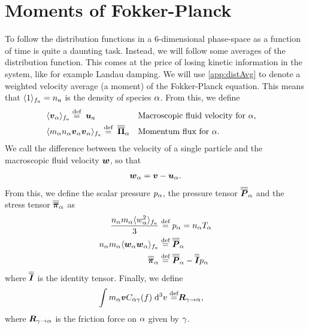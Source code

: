 \section{Moments of Fokker-Planck}
To follow the distribution functions in a 6-dimensional phase-space as a function of time is quite a daunting task.
Instead, we will follow some averages of the distribution function.
This comes at the price of losing kinetic information in the system, like for example Landau damping.
We will use \cref{app:distAvg} to denote a weighted velocity average (a moment) of the Fokker-Planck equation.
This means that $\langle{1}\rangle_{f_a}=n_a$ is the density of species $\alpha$.
From this, we define
%
\begin{align*}
    &\langle{\boldsymbol{v}_\alpha}\rangle_{f_a} \overset{\text{def}}{=} \; \boldsymbol{u}_a&  &\text{Macroscopic fluid velocity for }\alpha,&\\
    &\langle{m_\alpha n_\alpha\boldsymbol{v}_\alpha\boldsymbol{v}_\alpha}\rangle_{f_a} \overset{\text{def}}{=}\; \boldsymbol{\overline{\overline{\Pi}}}_\alpha&  &\text{Momentum flux for }\alpha.&
\end{align*}
%
We call the difference between the velocity of a single particle and the macroscopic fluid velocity $\boldsymbol{w}$, so that
%
\begin{align*}
    \boldsymbol{w}_\alpha = \boldsymbol{v} - \boldsymbol{u}_\alpha.
\end{align*}
%
From this, we define the scalar pressure $p_\alpha$, the pressure tensor $\boldsymbol{\overline{\overline{P}}}_\alpha$ and the stress tensor $\boldsymbol{\overline{\overline{\pi}}}_\alpha$ as
%
\begin{align*}
    \frac{n_\alpha m_\alpha\langle{w_\alpha^2}\rangle_{f_a}}{3} \overset{\text{def}}{=}& \; p_\alpha = n_\alpha T_\alpha\\
    n_\alpha m_\alpha\langle{\boldsymbol{w}_{\alpha}\boldsymbol{w}_{\alpha}}\rangle_{f_a} \overset{\text{def}}{=}& \; \boldsymbol{\overline{\overline{P}}}_\alpha\\
    \boldsymbol{\overline{\overline{\pi}}}_\alpha \overset{\text{def}}{=}& \; \boldsymbol{\overline{\overline{P}}}_\alpha - \boldsymbol{\overline{\overline{I}}}p_\alpha\\
\end{align*}
%
where $\boldsymbol{\overline{\overline{I}}}$ is the identity tensor.
Finally, we define
%
\begin{align*}
    \int {m_\alpha\boldsymbol{v} C_{\alpha\gamma}(f)} \; \text{d} {^3v} \overset{\text{def}}{=}& \boldsymbol{R}_{\gamma\to\alpha},
\end{align*}
%
where $\boldsymbol{R}_{\gamma\to\alpha}$ is the friction force on $\alpha$ given by $\gamma$.

